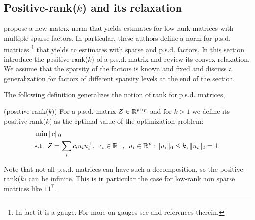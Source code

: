  


%


\subsection{Positive-rank($k$) and its relaxation}
\label{subsec:norm}

\citet{richard2014tight} propose a new matrix norm that yields estimates for low-rank matrices with multiple sparse factors. In particular, these authors define a norm for p.s.d. matrices \footnote{In fact it is a gauge. For more on gauges see \citet{chandrasekaran2010convex} and references therein.}  that yields to estimates with sparse and p.s.d. factors. In this section introduce the positive-rank($k$) of a p.s.d. matrix and review its convex relaxation. We assume that the sparsity of the factors is known and fixed and discuss a generalization for factors of different sparsity levels at the end of the section.

The following definition generalizes the notion of rank for p.s.d. matrices,
\begin{mydef}
(positive-rank($k$)) For a p.s.d. matrix $Z\in\mathbb{R}^{p\times p}$ and for $k>1$ we define its positive-rank($k$) as the optimal
value of the optimization problem:
\begin{align*}
&\min \|c\|_0 \\ 
&\text{s.t.} \enskip Z=\sum_{i} c_i u_i u_{i}^\top, \enskip c_i\in \mathbb{R}^{+}, \enskip u_{i}\in\mathbb{R}^p  :  \|u_{i}\|_0 \leq k, \|u_{i}\|_2 = 1.
\end{align*}
\end{mydef}
Note that not all p.s.d. matrices can have such a decomposition, so the positive-rank($k$) can be infinite. This is in particular the case for low-rank non sparse matrices like $11^{\top}$. 

